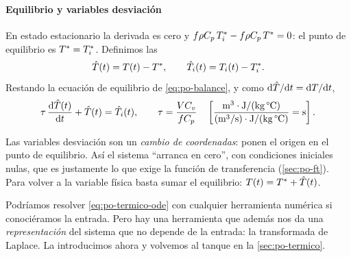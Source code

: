 \paragraph{Equilibrio y variables desviación} En estado estacionario la derivada es cero y $f\rho C_p\,T_i^{*}-f\rho C_p\,T^{*}=0$: el punto de equilibrio es $T^{*}=T_i^{*}$. Definimos las 
\begin{equation}
  \hat{T}(t)=T(t)-T^{*},\qquad \hat{T}_i(t)=T_i(t)-T_i^{*}.
  \label{eq:po-desviacion}
\end{equation}
Restando la ecuación de equilibrio de \eqref{eq:po-balance}, y como $\mathrm{d}\hat{T}/\mathrm{d} t=\mathrm{d} T/\mathrm{d} t$,
\begin{equation}
  \tau\,\frac{\mathrm{d} \hat{T}(t)}{\mathrm{d} t}+\hat{T}(t)=\hat{T}_i(t),\qquad
  \tau=\frac{V C_v}{f C_p}\quad\left[\frac{\text{m}^3\cdot\text{J/(kg\,°C)}}{(\text{m}^3/\text{s})\cdot\text{J/(kg\,°C)}}=\text{s}\right].
  \label{eq:po-termico-ode}
\end{equation}

\begin{ideaclave}
Las variables desviación son un \emph{cambio de coordenadas}: ponen el origen en el punto de equilibrio. Así el sistema ``arranca en cero'', con condiciones iniciales nulas, que es justamente lo que exige la función de transferencia (\cref{sec:po-ft}). Para volver a la variable física basta sumar el equilibrio: $T(t)=T^{*}+\hat{T}(t)$.
\end{ideaclave}

Podríamos resolver \eqref{eq:po-termico-ode} con cualquier herramienta numérica si conociéramos la entrada. Pero hay una herramienta que además nos da una \emph{representación} del sistema que no depende de la entrada: la transformada de Laplace. La introducimos ahora y volvemos al tanque en la \cref{sec:po-termico}.
